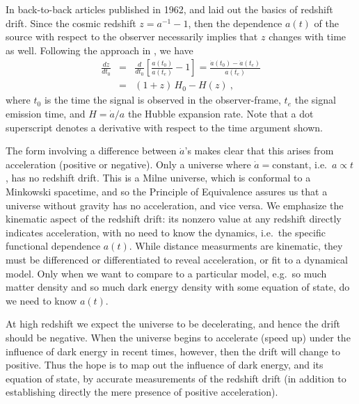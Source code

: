 \documentclass[preprint2, 10pt]{aastex}
\newcommand{\bea}{\begin{eqnarray}}
\newcommand{\eea}{\end{eqnarray}}
\begin{document}
In back-to-back articles published in 1962, \citet{mcvittie} and 
\citet{sandage} laid out the basics of redshift drift.  Since the 
cosmic redshift $z=a^{-1}-1$, then the dependence $a(t)$ of the source with 
respect to the observer necessarily implies that $z$ changes with time as 
well. Following the approach in \citet{fpoc}, we have 
\bea 
\frac{dz}{dt_0}&=&\frac{d}{dt_0}\left[\frac{a(t_0)}{a(t_e)}-1\right] 
=\frac{\dot a(t_0)-\dot a (t_e)}{a(t_e)}\\ 
&=&(1+z)\,H_0-H(z)\ , 
\eea 
where $t_0$ is the time the signal is observed in the observer-frame, 
$t_e$ the signal emission time, and $H=\dot a/a$ the Hubble expansion rate. 
Note that a dot superscript denotes a derivative with respect to the 
time argument shown. 

The form involving a difference 
between $\dot a$'s makes clear that this arises from acceleration (positive 
or negative).
Only a universe where $\dot a=\mbox{constant}$, i.e.\ $a\propto t$, 
has no redshift drift.  This is a Milne universe, which is conformal to a 
Minkowski spacetime, and so the Principle of Equivalence assures us that 
a universe without gravity has no acceleration, and vice versa. 
We emphasize the kinematic aspect of the redshift drift: its nonzero 
value at any redshift directly indicates acceleration, with no need to know the dynamics, 
i.e.\ the specific functional dependence $a(t)$. 
While distance measurments are kinematic, they must be differenced or 
differentiated to reveal acceleration, or fit to a dynamical model. 
Only when we want to compare 
to a particular model, e.g.\ so much matter density and so much dark energy 
density with some equation of state, do we need to know $a(t)$.


At high redshift we expect the universe to be decelerating, and hence 
the drift should be negative.  When the universe begins to accelerate 
(speed up) under the influence of dark energy in recent times, however, 
then the drift will change to positive.  Thus the hope is to map out the 
influence of dark energy, and its equation of state, by accurate 
measurements of the redshift drift (in addition to establishing directly 
the mere presence of positive acceleration). 
\end{document}
